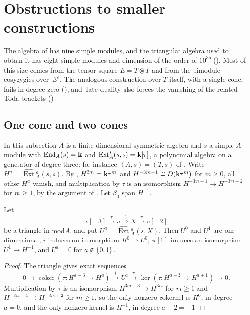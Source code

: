 \section{Obstructions to smaller constructions}
\label{sec:obstructions}

The algebra of  has nine simple modules, and the
triangular algebra used to obtain it has eight simple modules and dimension of
the order of $10^{35}$ (). Most of this size comes
from the tensor square ${E=T\otimes T}$ and from the bimodule cosyzygies
over~$E^e$. The analogous construction over $T$ itself, with a single cone,
fails in degree zero
(), and Tate duality also forces the
vanishing of the related Toda brackets ().

\subsection{One cone and two cones}
\label{subsec:one-cone}

In this subsection $A$ is a finite-dimensional symmetric algebra and $s$ a
simple $A$-module with ${\operatorname{End}_A(s)=\mathbf{k}}$ and
${\operatorname{Ext}^*_A(s,s)=\mathbf{k}[\tau]}$, a polynomial algebra on a generator
of degree three; for instance ${(A,s)=(T,s)}$ of . Write
${H^a=\widehat{\operatorname{Ext}}{}^a_A(s,s)}$. By ,
${H^{3m}=\mathbf{k}\tau^m}$ and ${H^{-3m-1}\cong D(\mathbf{k}\tau^m)}$ for ${m\geq0}$, all other
$H^a$ vanish, and multiplication by $\tau$ is an isomorphism
${H^{-3m-1}\to H^{-3m+2}}$ for ${m\geq1}$, by the argument of
. Let $\beta_0$ span $H^{-1}$.

\begin{proposition}
  \label{prop:one-cone}
  Let
  \[
    s[-3]\xrightarrow{\tau}s\xrightarrow{i}X\xrightarrow{\pi}s[-2]
  \]
  be a triangle in $\operatorname{\underline{mod}}A$, and put
  ${U^a=\widehat{\operatorname{Ext}}{}^a_A(s,X)}$. Then $U^0$ and $U^1$ are
  one-dimensional, $i$ induces an isomorphism ${H^0\to U^0}$, $\pi[1]$ induces an
  isomorphism ${U^1\to H^{-1}}$, and ${U^a=0}$ for ${a\notin\set{0,1}}$.
\end{proposition}

\begin{proof}
  The triangle gives exact sequences
  \[
    0\longrightarrow\operatorname{coker}(\tau\colon H^{a-3}\to H^a)
    \xrightarrow{\ i\ }U^a\xrightarrow{\ \pi\ }\ker(\tau\colon H^{a-2}\to
    H^{a+1})\longrightarrow0.
  \]
  Multiplication by $\tau$ is an isomorphism ${H^{3m-3}\to H^{3m}}$ for ${m\geq1}$
  and ${H^{-3m-1}}\to{ H^{-3m+2}}$ for ${m\geq1}$, so the only nonzero cokernel is
  $H^0$, in degree ${a=0}$, and the only nonzero kernel is $H^{-1}$, in degree
  ${a-2=-1}$.
\end{proof}

